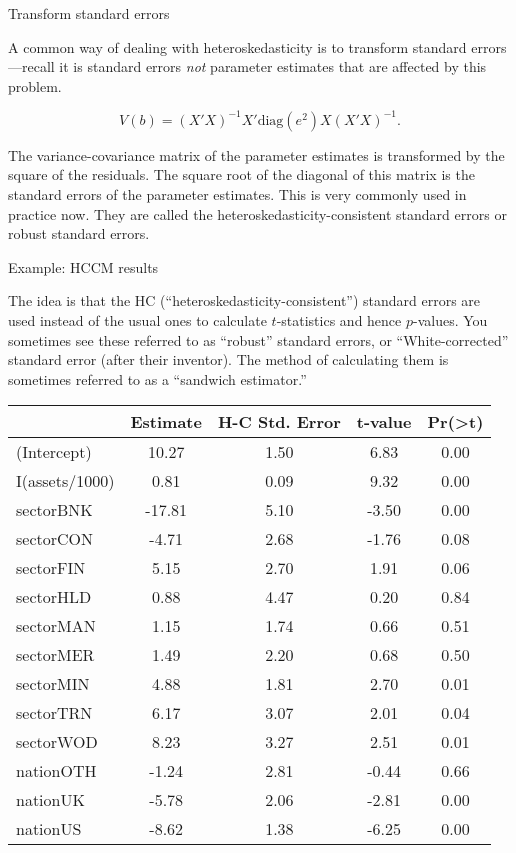 \documentclass[10pt,ignorenonframetext,]{beamer}
\begin{document}
\begin{frame}{Transform standard errors}

A common way of dealing with heteroskedasticity is to transform standard
errors---recall it is standard errors \emph{not} parameter estimates
that are affected by this problem.

\[
V(b) = (X'X)^{-1} X' \text{diag}(e^2) X (X'X)^{-1}.
\]

The variance-covariance matrix of the parameter estimates is transformed
by the square of the residuals. The square root of the diagonal of this
matrix is the standard errors of the parameter estimates. This is very
commonly used in practice now. They are called the
heteroskedasticity-consistent standard errors or robust standard errors.

\end{frame}

\begin{frame}{Example: HCCM results}

The idea is that the HC (``heteroskedasticity-consistent'') standard
errors are used instead of the usual ones to calculate \(t\)-statistics
and hence \(p\)-values. You sometimes see these referred to as
``robust'' standard errors, or ``White-corrected'' standard error (after
their inventor). The method of calculating them is sometimes referred to
as a ``sandwich estimator.''

\scriptsize

\begin{longtable}[]{@{}lcccc@{}}
\toprule
& Estimate & H-C Std. Error & t-value &
Pr(\textgreater{}\textbar{}t\textbar{})\tabularnewline
\midrule
\endhead
(Intercept) & 10.27 & 1.50 & 6.83 & 0.00\tabularnewline
I(assets/1000) & 0.81 & 0.09 & 9.32 & 0.00\tabularnewline
sectorBNK & -17.81 & 5.10 & -3.50 & 0.00\tabularnewline
sectorCON & -4.71 & 2.68 & -1.76 & 0.08\tabularnewline
sectorFIN & 5.15 & 2.70 & 1.91 & 0.06\tabularnewline
sectorHLD & 0.88 & 4.47 & 0.20 & 0.84\tabularnewline
sectorMAN & 1.15 & 1.74 & 0.66 & 0.51\tabularnewline
sectorMER & 1.49 & 2.20 & 0.68 & 0.50\tabularnewline
sectorMIN & 4.88 & 1.81 & 2.70 & 0.01\tabularnewline
sectorTRN & 6.17 & 3.07 & 2.01 & 0.04\tabularnewline
sectorWOD & 8.23 & 3.27 & 2.51 & 0.01\tabularnewline
nationOTH & -1.24 & 2.81 & -0.44 & 0.66\tabularnewline
nationUK & -5.78 & 2.06 & -2.81 & 0.00\tabularnewline
nationUS & -8.62 & 1.38 & -6.25 & 0.00\tabularnewline
\bottomrule
\end{longtable}

\end{frame}
\end{document}
